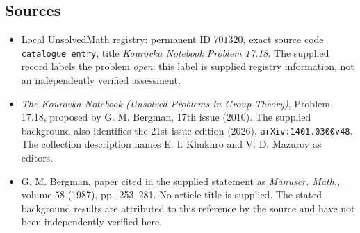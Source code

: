 \documentclass[11pt]{article}
\begin{document}
\subsection{Sources}
\begin{itemize}
\item Local UnsolvedMath registry: permanent ID \(701320\), exact source code \texttt{catalogue entry}, title \emph{Kourovka Notebook Problem 17.18}. The supplied record labels the problem \emph{open}; this label is supplied registry information, not an independently verified assessment.
\item \emph{The Kourovka Notebook (Unsolved Problems in Group Theory)}, Problem 17.18, proposed by G. M. Bergman, 17th issue (2010). The supplied background also identifies the 21st issue edition (2026), \texttt{arXiv:1401.0300v48}. The collection description names E. I. Khukhro and V. D. Mazurov as editors.
\item G. M. Bergman, paper cited in the supplied statement as \emph{Manuscr. Math.}, volume \(58\) (1987), pp.\ 253--281. No article title is supplied. The stated background results are attributed to this reference by the source and have not been independently verified here.
\end{itemize}
\end{document}
